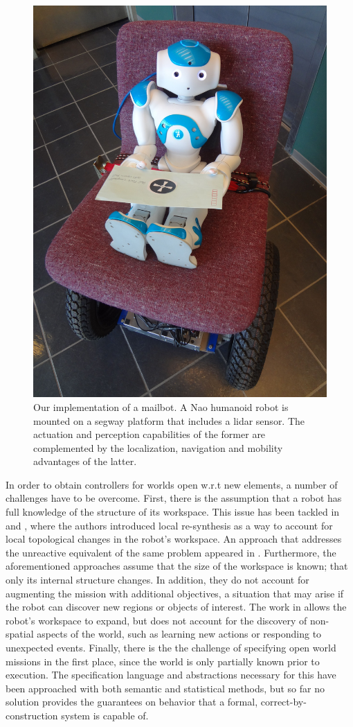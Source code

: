 \begin{figure}[ht]
	\centering
	\includegraphics[width=0.7\columnwidth, clip]{./img/mailbot.jpg}
	\caption{Our implementation of a mailbot. A Nao humanoid robot is mounted on a segway platform that includes a lidar sensor. The actuation and perception capabilities of the former are complemented by the localization, navigation and mobility advantages of the latter.}
	\label{Fig:mailbot}
\end{figure}

In order to obtain controllers for worlds open w.r.t new elements, a number of challenges have to be overcome. 
First, there is the assumption that a robot has full knowledge of the structure of its workspace. This issue has been tackled in \cite{MurrayICRA2012} and \cite{MurrayICRA2013a}, where the authors introduced local re-synthesis as a way to account for local topological changes in the robot's workspace. 
An approach that addresses the unreactive equivalent of the same problem appeared in \cite{Dimos2013ICRA}. 
Furthermore, the aforementioned approaches assume that the size of the workspace is known; that only its internal structure changes. In addition, they do not account for augmenting the mission with additional objectives, a situation that may arise if the robot can discover new regions or objects of interest. 
The work in \cite{BingxinRSS2012} allows the robot's workspace to expand, but does not account for the discovery of non-spatial aspects of the world, such as learning new actions or responding to unexpected events.
Finally, there is the the challenge of specifying open world missions in the first place, since the world is only partially known prior to execution. The specification language and abstractions necessary for this have been approached with both semantic \cite{Joshi2012, MatthiasAI2010} and statistical \cite{Tellex2011} methods, but so far no solution provides the guarantees on behavior that a formal, correct-by-construction system is capable of. 

